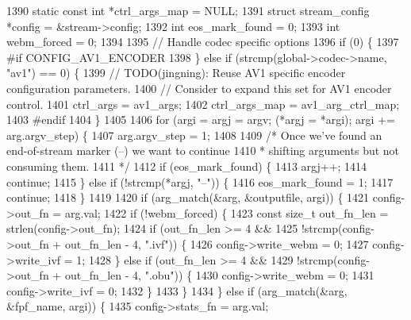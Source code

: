 \begin{DoxyCodeInclude}
{{{{{{{{{{{{{{{{1390   \textcolor{keyword}{static} \textcolor{keyword}{const} \textcolor{keywordtype}{int} *ctrl\_args\_map = NULL;
1391   \textcolor{keyword}{struct }stream\_config *config = &stream->config;
1392   \textcolor{keywordtype}{int} eos\_mark\_found = 0;
1393   \textcolor{keywordtype}{int} webm\_forced = 0;
1394 
1395   \textcolor{comment}{// Handle codec specific options}
1396   \textcolor{keywordflow}{if} (0) \{
1397 \textcolor{preprocessor}{#if CONFIG\_AV1\_ENCODER}
1398   \} \textcolor{keywordflow}{else} \textcolor{keywordflow}{if} (strcmp(global->codec->name, \textcolor{stringliteral}{"av1"}) == 0) \{
1399     \textcolor{comment}{// TODO(jingning): Reuse AV1 specific encoder configuration parameters.}
1400     \textcolor{comment}{// Consider to expand this set for AV1 encoder control.}
1401     ctrl\_args = av1\_args;
1402     ctrl\_args\_map = av1\_arg\_ctrl\_map;
1403 \textcolor{preprocessor}{#endif}
1404   \}
1405 
1406   \textcolor{keywordflow}{for} (argi = argj = argv; (*argj = *argi); argi += arg.argv\_step) \{
1407     arg.argv\_step = 1;
1408 
1409     \textcolor{comment}{/* Once we've found an end-of-stream marker (--) we want to continue}
1410 \textcolor{comment}{     * shifting arguments but not consuming them.}
1411 \textcolor{comment}{     */}
1412     \textcolor{keywordflow}{if} (eos\_mark\_found) \{
1413       argj++;
1414       \textcolor{keywordflow}{continue};
1415     \} \textcolor{keywordflow}{else} \textcolor{keywordflow}{if} (!strcmp(*argj, \textcolor{stringliteral}{"--"})) \{
1416       eos\_mark\_found = 1;
1417       \textcolor{keywordflow}{continue};
1418     \}
1419 
1420     \textcolor{keywordflow}{if} (arg\_match(&arg, &outputfile, argi)) \{
1421       config->out\_fn = arg.val;
1422       \textcolor{keywordflow}{if} (!webm\_forced) \{
1423         \textcolor{keyword}{const} \textcolor{keywordtype}{size\_t} out\_fn\_len = strlen(config->out\_fn);
1424         \textcolor{keywordflow}{if} (out\_fn\_len >= 4 &&
1425             !strcmp(config->out\_fn + out\_fn\_len - 4, \textcolor{stringliteral}{".ivf"})) \{
1426           config->write\_webm = 0;
1427           config->write\_ivf = 1;
1428         \} \textcolor{keywordflow}{else} \textcolor{keywordflow}{if} (out\_fn\_len >= 4 &&
1429                    !strcmp(config->out\_fn + out\_fn\_len - 4, \textcolor{stringliteral}{".obu"})) \{
1430           config->write\_webm = 0;
1431           config->write\_ivf = 0;
1432         \}
1433       \}
1434     \} \textcolor{keywordflow}{else} \textcolor{keywordflow}{if} (arg\_match(&arg, &fpf\_name, argi)) \{
1435       config->stats\_fn = arg.val;
}}}}}}}}}}}}}}}}
\end{DoxyCodeInclude}
